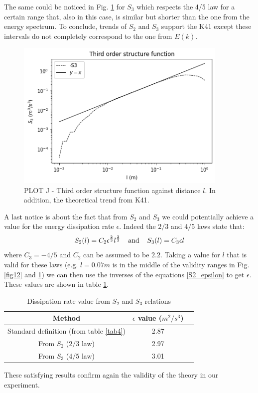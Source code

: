 \documentclass[11pt,titlepage]{article}
\begin{document}
The same could be noticed in Fig. \ref{fig13} for $S_3$ which respects the 4/5 law for a certain range that, also in this case, is similar but shorter than the one from the energy spectrum. To conclude, trends of $S_2$ and $S_3$ support the K41 except these intervals do not completely correspond to the one from $E(k)$. 
\newpage
\begin{center}
	\begin{figure} [h]
		\centering
		\includegraphics[width = 4in]{./figures/ex1_7_2.png}
		\caption{PLOT J - Third order structure function against distance $l$. In addition, the theoretical trend from K41.}
		\label{fig13}
	\end{figure}
\end{center}

A last notice is about the fact that from $S_2$ and $S_3$ we could potentially achieve a value for the energy dissipation rate $\epsilon$. Indeed the $2/3$ and $4/5$ laws state that:
\begin{equation} \label{S2_epsilon}
	S_2(l) = C_2 \epsilon^\frac{2}{3} l^\frac{2}{3} \hspace{4mm} \text{and} \hspace{4mm}S_3(l) = C_3 \epsilon l
\end{equation}
where $C_3 = -4/5$ and $C_2$ can be assumed to be $2.2$. Taking a value for $l$ that is valid for these laws (e.g. $l=0.07m$ is in the middle of the validity ranges in Fig. \ref{fig12} and \ref{fig13}) we can then use the inverses of the equations \ref{S2_epsilon} to get $\epsilon$. These values are shown in table \ref{tab6}.

\begin{table}[h]
	\centering
	\caption{Dissipation rate value from $S_2$ and $S_3$ relations} \label{tab6}
	\begin{tabular}{ | c | c | c |}
		\hline
		Method &  $\epsilon$ value ($m^2/s^3$) \\
		\hline
		Standard definition (from table \ref{tab4}) & 2.87 \\
		\hline
		From $S_2$ ($2/3$ law) & 2.97\\
		\hline
		From $S_3$ ($4/5$ law) & 3.01\\
		\hline
	\end{tabular}
\end{table}
These satisfying results confirm again the validity of the theory in our experiment.
\newpage
\end{document}
